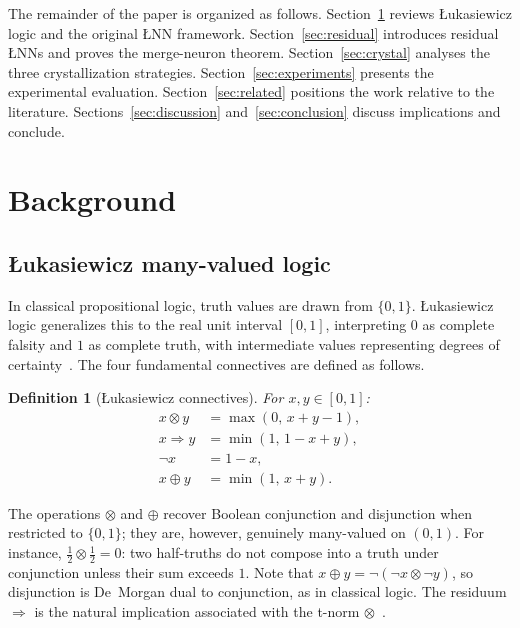 \documentclass[10pt,a4paper,twoside]{article}
\newtheorem{definition}[theorem]{Definition}
\newcommand{\tnorm}{\otimes}      %
\newcommand{\resid}{\Rightarrow}  %
\newcommand{\disj}{\oplus}        %
\newcommand{\LNN}{\L{}NN}
\begin{document}
The remainder of the paper is organized as follows.
Section~\ref{sec:background} reviews \L{}ukasiewicz logic and the original
\LNN{} framework.
Section~\ref{sec:residual} introduces residual \LNN{}s and proves the merge-neuron
theorem.
Section~\ref{sec:crystal} analyses the three crystallization strategies.
Section~\ref{sec:experiments} presents the experimental evaluation.
Section~\ref{sec:related} positions the work relative to the literature.
Sections~\ref{sec:discussion} and~\ref{sec:conclusion} discuss implications and
conclude.

\section{Background}
\label{sec:background}

\subsection{\L{}ukasiewicz many-valued logic}
\label{ssec:logic}

In classical propositional logic, truth values are drawn from $\{0,1\}$.
\L{}ukasiewicz logic generalizes this to the real unit interval $[0,1]$,
interpreting $0$ as complete falsity and $1$ as complete truth, with
intermediate values representing degrees of certainty~\cite{hajek1998}.
The four fundamental connectives are defined as follows.
\begin{definition}[\L{}ukasiewicz connectives]
For $x, y \in [0,1]$:
\begin{align}
  x \tnorm y  &= \max(0,\, x + y - 1),   \label{eq:tnorm}\\
  x \resid y  &= \min(1,\, 1 - x + y),   \label{eq:resid}\\
  \neg x       &= 1 - x,                  \label{eq:neg}\\
  x \disj y   &= \min(1,\, x + y).       \label{eq:disj}
\end{align}
\end{definition}
The operations $\tnorm$ and $\disj$ recover Boolean conjunction and disjunction
when restricted to $\{0,1\}$; they are, however, genuinely many-valued on $(0,1)$.
For instance, $\tfrac{1}{2} \tnorm \tfrac{1}{2} = 0$: two half-truths do not
compose into a truth under conjunction unless their sum exceeds $1$.
Note that $x \disj y = \neg(\neg x \tnorm \neg y)$, so disjunction is
De~Morgan dual to conjunction, as in classical logic.
The residuum $\resid$ is the natural implication associated with the t-norm
$\tnorm$~\cite{hajek1998}.
\end{document}

